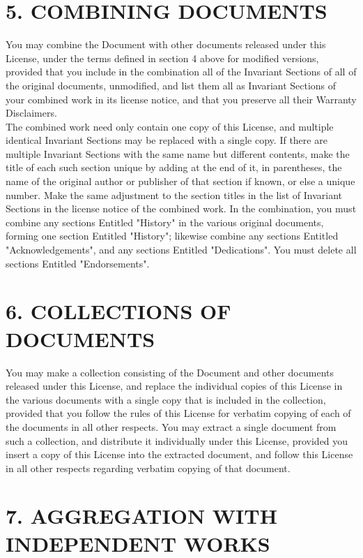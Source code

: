\section{5. COMBINING DOCUMENTS}



You may combine the Document with other documents released under this License, under the terms defined in section 4 above for modified versions, provided that you include in the combination all of the Invariant Sections of all of the original documents, unmodified, and list them all as Invariant Sections of your combined work in its license notice, and that you preserve all their Warranty Disclaimers.\\
The combined work need only contain one copy of this License, and multiple identical Invariant Sections may be replaced with a single copy. If there are multiple Invariant Sections with the same name but different contents, make the title of each such section unique by adding at the end of it, in parentheses, the name of the original author or publisher of that section if known, or else a unique number. Make the same adjustment to the section titles in the list of Invariant Sections in the license notice of the combined work.
In the combination, you must combine any sections Entitled "History" in the various original documents, forming one section Entitled "History"; likewise combine any sections Entitled "Acknowledgements", and any sections Entitled "Dedications". You must delete all sections Entitled "Endorsements".

\section{6. COLLECTIONS OF DOCUMENTS}


You may make a collection consisting of the Document and other documents released under this License, and replace the individual copies of this License in the various documents with a single copy that is included in the collection, provided that you follow the rules of this License for verbatim copying of each of the documents in all other respects.
You may extract a single document from such a collection, and distribute it individually under this License, provided you insert a copy of this License into the extracted document, and follow this License in all other respects regarding verbatim copying of that document.

\section{7. AGGREGATION WITH INDEPENDENT WORKS}


